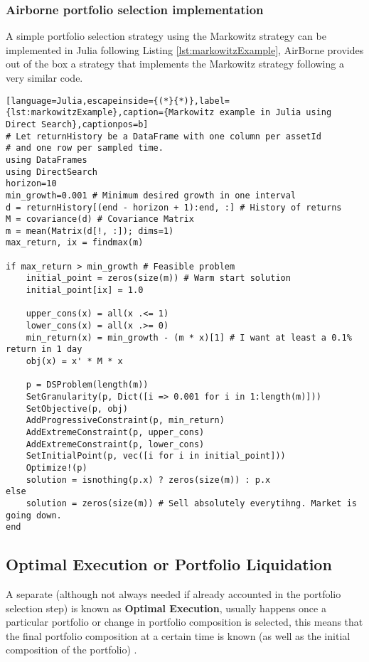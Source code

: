 \subsubsection{Airborne portfolio selection implementation}
A simple portfolio selection strategy using the Markowitz strategy can be implemented in Julia following Listing \ref{lst:markowitzExample}, AirBorne provides out of the box a strategy that implements the Markowitz strategy following a very similar code.

\clearpage

\begin{lstlisting}[language=Julia,escapeinside={(*}{*)},label={lst:markowitzExample},caption={Markowitz example in Julia using Direct Search},captionpos=b]
# Let returnHistory be a DataFrame with one column per assetId
# and one row per sampled time.
using DataFrames
using DirectSearch
horizon=10
min_growth=0.001 # Minimum desired growth in one interval
d = returnHistory[(end - horizon + 1):end, :] # History of returns
M = covariance(d) # Covariance Matrix
m = mean(Matrix(d[!, :]); dims=1)
max_return, ix = findmax(m)

if max_return > min_growth # Feasible problem
    initial_point = zeros(size(m)) # Warm start solution
    initial_point[ix] = 1.0

    upper_cons(x) = all(x .<= 1)
    lower_cons(x) = all(x .>= 0)
    min_return(x) = min_growth - (m * x)[1] # I want at least a 0.1% return in 1 day 
    obj(x) = x' * M * x

    p = DSProblem(length(m))
    SetGranularity(p, Dict([i => 0.001 for i in 1:length(m)]))
    SetObjective(p, obj)
    AddProgressiveConstraint(p, min_return)
    AddExtremeConstraint(p, upper_cons)
    AddExtremeConstraint(p, lower_cons)
    SetInitialPoint(p, vec([i for i in initial_point]))
    Optimize!(p)
    solution = isnothing(p.x) ? zeros(size(m)) : p.x
else
    solution = zeros(size(m)) # Sell absolutely everytihng. Market is going down.
end

\end{lstlisting}

\subsection{Optimal Execution or Portfolio Liquidation}
A separate (although not always needed if already accounted in the portfolio selection step) is known as \textbf{Optimal Execution}, usually happens once a particular portfolio or change in portfolio composition is selected, this means that the final portfolio composition at a certain time is known (as well as the initial composition of the portfolio) \cite{OptimalExecutionReview}.

